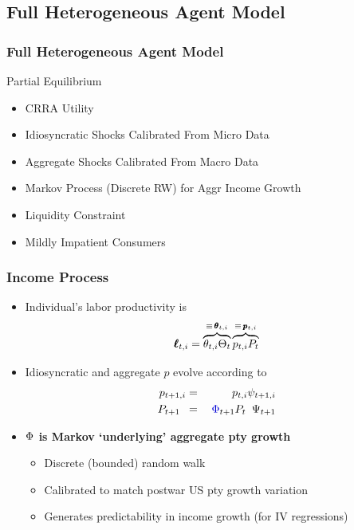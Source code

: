 \documentclass[10pt,english,t,10pt]{beamer}
\newcommand{\jemph}[1]{{\color{StataDarkBlue}#1}}
\newcommand{\jbemph}[1]{\textbf{\color{SlideNavy}#1}}
\providecommand{\jemph}[1]{{\color{jirkasblue}#1}}
\begin{document}
\subsection{Full Heterogeneous Agent Model}
\begin{frame}
\frametitle{Full Heterogeneous Agent Model}

\begin{block}{Partial Equilibrium}
\begin{itemize}
\item  CRRA Utility
\item  Idiosyncratic Shocks Calibrated From Micro Data
\item  Aggregate Shocks Calibrated From Macro Data
\item Markov Process (Discrete RW) for Aggr Income Growth
\item  Liquidity Constraint
\item  Mildly Impatient Consumers
\end{itemize}
\end{block}

\end{frame}


\begin{frame}
\frametitle{Income Process}

\begin{itemize}
\item  Individual's labor productivity is
$$
\pmb{\ell}_{t,i} = \overbrace{\theta_{t,i}\Theta_{t}}^{\equiv\,\pmb{\theta}_{t,i}}\overbrace{{p}_{t,i} {P}_{t}}^{\equiv\, \pmb{p}_{t,i}}
$$

\item  Idiosyncratic and aggregate $p$ evolve according to
\begin{eqnarray*}
{{p}}_{t+1,i} & =&  \phantom{\jemph{\PtyGro}_{t+1}}{{p}}_{t,i} \psi_{t+1,i}  \\
 {P}_{t+1\phantom{,i}} & =&  \jemph{\PtyGro}_{t+1} {P}_{t\phantom{,i}}\Psi_{t+1}
\end{eqnarray*}


\pause
  \item \jbemph{$\Phi$ is Markov `underlying' aggregate pty growth}
    \begin{itemize}
    \setlength{\itemsep}{1mm}
    \item Discrete (bounded) random walk
    \item Calibrated to match postwar US pty growth variation
    \item Generates predictability in income growth (for IV regressions)
    \end{itemize}
  \end{itemize}
\end{frame}
\end{document}
